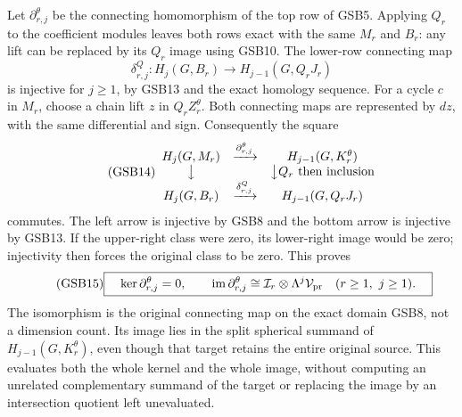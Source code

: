 Let $\partial^\theta_{r,j}$ be the connecting homomorphism of the
top row of GSB5. Applying $Q_r$ to the coefficient modules leaves
both rows exact with the same $M_r$ and $B_r$: any lift can be
replaced by its $Q_r$ image using GSB10. The lower-row connecting map
\[
\delta^Q_{r,j}:H_j(G,B_r)\longrightarrow H_{j-1}(G,Q_rJ_r)
\]
is injective for $j\ge1$, by GSB13 and the exact homology sequence.
For a cycle $c$ in $M_r$, choose a chain lift $z$ in $Q_rZ_r^\theta$.
Both connecting maps are represented by $dz$, with the same
differential and sign. Consequently the square
\begin{equation}\tag{GSB14}
\begin{array}{ccc}
H_j(G,M_r)&\xrightarrow{\partial^\theta_{r,j}}&
                       H_{j-1}(G,K_r^\theta)\\
\big\downarrow&&\big\downarrow Q_r\ \text{then inclusion}\\
H_j(G,B_r)&\xrightarrow{\delta^Q_{r,j}}&H_{j-1}(G,Q_rJ_r)
\end{array}
\end{equation}
commutes. The left arrow is injective by GSB8 and the bottom
arrow is injective by GSB13. If the upper-right class were zero,
its lower-right image would be zero; injectivity then forces the
original class to be zero. This proves
\begin{equation}\tag{GSB15}
\boxed{\quad
\ker\partial^\theta_{r,j}=0,\qquad
\operatorname{im}\partial^\theta_{r,j}
 \cong\mathcal I_r\otimes\Lambda^j\mathcal V_{\rm pr}
\quad(r\ge1,\ j\ge1).\quad}
\end{equation}
The isomorphism is the original connecting map on the exact domain
GSB8, not a dimension count. Its image lies in the split spherical
summand of $H_{j-1}(G,K_r^\theta)$, even though that target retains
the entire original source. This evaluates both the whole kernel
and the whole image, without computing an unrelated complementary
summand of the target or replacing the image by an intersection
quotient left unevaluated.

